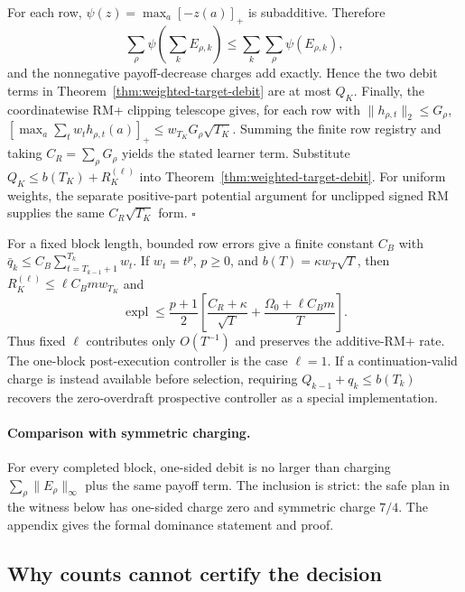 For each row, $\psi(z)=\max_a[-z(a)]_+$ is subadditive.  Therefore
\[
\sum_\rho\psi\!\left(\sum_kE_{\rho,k}\right)
\le\sum_k\sum_\rho\psi(E_{\rho,k}),
\]
and the nonnegative payoff-decrease charges add exactly.  Hence the two debit
terms in Theorem~\ref{thm:weighted-target-debit} are at most $Q_K$.
Finally, the coordinatewise RM+ clipping telescope gives, for each row with
$\lVert h_{\rho,t}\rVert_2\le G_\rho$,
$[\max_a\sum_t w_th_{\rho,t}(a)]_+
\le w_{T_K}G_\rho\sqrt{T_K}$.  Summing the finite row registry and taking
$C_R=\sum_\rho G_\rho$ yields the stated learner term.  Substitute
$Q_K\le b(T_K)+R_K^{(\ell)}$ into
Theorem~\ref{thm:weighted-target-debit}.  For uniform weights, the separate
positive-part potential argument for unclipped signed RM supplies the same
$C_R\sqrt{T_K}$ form. \hfill$\square$

For a fixed block length, bounded row errors give a finite constant $C_B$ with
$\bar q_k\le C_B\sum_{t=T_{k-1}+1}^{T_k}w_t$.  If $w_t=t^p$, $p\ge0$, and
$b(T)=\kappa w_T\sqrt T$, then
$R_K^{(\ell)}\le\ell C_Bmw_{T_K}$ and
\[
\operatorname{expl}\le\frac{p+1}{2}\left[
\frac{C_R+\kappa}{\sqrt T}
+\frac{\Omega_0+\ell C_Bm}{T}\right].
\]
Thus fixed $\ell$ contributes only $O(T^{-1})$ and preserves the additive-RM+
rate.  The one-block post-execution controller is the case $\ell=1$.  If a
continuation-valid charge is instead available before selection, requiring
$Q_{k-1}+q_k\le b(T_k)$ recovers the zero-overdraft prospective controller as
a special implementation.

\paragraph{Comparison with symmetric charging.}
For every completed block, one-sided debit is no larger than charging
$\sum_\rho\lVert E_\rho\rVert_\infty$ plus the same payoff term.  The
inclusion is strict: the safe plan in the witness below has one-sided charge
zero and symmetric charge $7/4$.  The appendix gives the formal dominance
statement and proof.

\subsection{Why counts cannot certify the decision}

